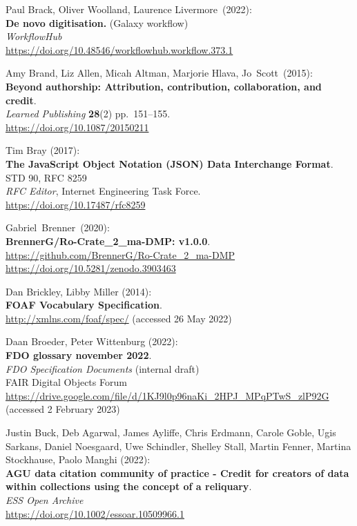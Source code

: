 \begin{thebibliography}{9}
Paul Brack, Oliver Woolland, Laurence Livermore~(2022):\\
\textbf{De novo digitisation.} (Galaxy workflow)\\
\emph{WorkflowHub}\\
\url{https://doi.org/10.48546/workflowhub.workflow.373.1}

Amy Brand, Liz Allen, Micah Altman, Marjorie Hlava, Jo~Scott~(2015):\\
\textbf{Beyond authorship: Attribution, contribution, collaboration, and
credit}.\\
\emph{Learned Publishing} \textbf{28}(2) pp.~151--155.\\
\url{https://doi.org/10.1087/20150211}

Tim Bray (2017):\\
\textbf{The JavaScript Object Notation (JSON) Data
Interchange Format}.\\
STD 90, RFC 8259\\
\emph{RFC Editor}, 
Internet Engineering Task Force.\\
\url{https://doi.org/10.17487/rfc8259}

Gabriel~Brenner~(2020):\\
\textbf{BrennerG/Ro-Crate\_2\_ma-DMP: v1.0.0}.\\
\url{https://github.com/BrennerG/Ro-Crate_2_ma-DMP}\\
\url{https://doi.org/10.5281/zenodo.3903463}

Dan Brickley, Libby Miller (2014): \\
\textbf{FOAF Vocabulary Specification}.\\
\url{http://xmlns.com/foaf/spec/} (accessed 26 May 2022)

Daan Broeder, Peter Wittenburg (2022): \\
\textbf{{FDO} glossary november 2022}.\\
\emph{FDO Specification Documents} (internal draft)\\
FAIR Digital Objects Forum
\url{https://drive.google.com/file/d/1KJ9l0p96naKi_2HPJ_MPqPTwS_zlP92G}
(accessed 2 February 2023)

Justin Buck, Deb Agarwal, James Ayliffe, Chris Erdmann, Carole Goble, Ugis Sarkans, Daniel Noesgaard, Uwe Schindler, Shelley Stall, Martin Fenner, Martina Stockhause, Paolo Manghi (2022):\\
\textbf{AGU data citation community of practice - Credit for creators of data within collections using the concept of a reliquary}.\\ 
\emph{ESS Open Archive}\\
\url{https://doi.org/10.1002/essoar.10509966.1}



\end{thebibliography}
